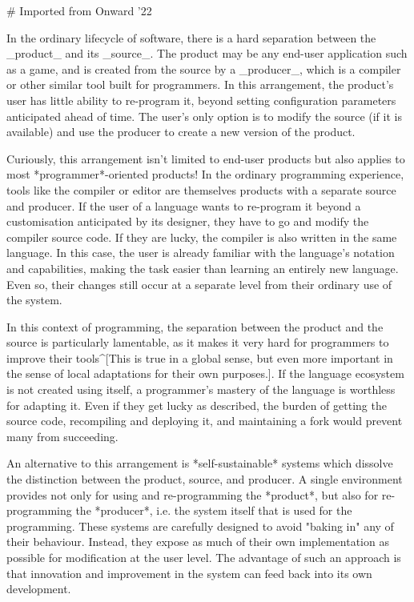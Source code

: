 {# Imported from Onward '22

In the ordinary lifecycle of software, there is a hard separation between the _product_ and its _source_. The product may be any end-user application such as a game, and is created from the source by a _producer_, which is a compiler or other similar tool built for programmers. In this arrangement, the product's user has little ability to re-program it, beyond setting configuration parameters anticipated ahead of time. The user's only option is to modify the source (if it is available) and use the producer to create a new version of the product.

Curiously, this arrangement isn't limited to end-user products but also applies to most *programmer*-oriented products! In the ordinary programming experience, tools like the compiler or editor are themselves products with a separate source and producer. If the user of a language wants to re-program it beyond a customisation anticipated by its designer, they have to go and modify the compiler source code. If they are lucky, the compiler is also written in the same language. In this case, the user is already familiar with the language's notation and capabilities, making the task easier than learning an entirely new language. Even so, their changes still occur at a separate level from their ordinary use of the system.

In this context of programming, the separation between the product and the source is particularly lamentable, as it makes it very hard for programmers to improve their tools^[This is true in a global sense, but even more important in the sense of local adaptations for their own purposes.]. If the language ecosystem is not created using itself, a programmer's mastery of the language is worthless for adapting it. Even if they get lucky as described, the burden of getting the source code, recompiling and deploying it, and maintaining a fork would prevent many from succeeding.

An alternative to this arrangement is *self-sustainable* systems which dissolve the distinction between the product, source, and producer. A single environment provides not only for using and re-programming the *product*, but also for re-programming the *producer*, i.e. the system itself that is used for the programming. These systems are carefully designed to avoid "baking in" any of their behaviour. Instead, they expose as much of their own implementation as possible for modification at the user level. The advantage of such an approach is that innovation and improvement in the system can feed back into its own development.

}
